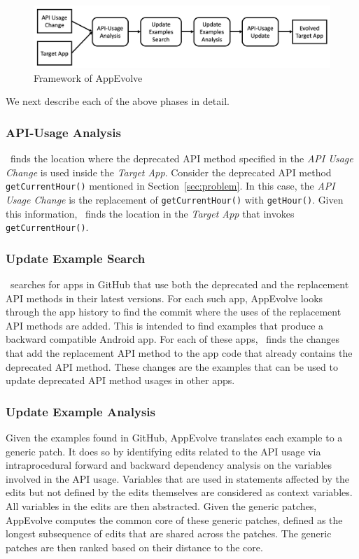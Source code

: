 \begin{figure}[t]
	\centering
	\includegraphics[width=0.8\linewidth]{framework.png}
	\caption{Framework of AppEvolve}
	\label{fig:framework}
\end{figure}

We next describe each of the above phases in detail.
\subsubsection{API-Usage Analysis}
\toolname\ finds the location where the deprecated API method specified in
the {\em API Usage Change} is used inside the {\em Target App}. Consider
the deprecated API method \texttt{getCurrentHour()} mentioned in
Section~\ref{sec:problem}.  In this case, the {\em API Usage Change} is the
replacement of \texttt{getCurrentHour()} with \texttt{getHour()}. Given
this information, \toolname\ finds the location in the {\em Target App}
that invokes \texttt{getCurrentHour()}.

\subsubsection{Update Example Search}
\toolname\ searches for apps in GitHub that use both the deprecated and the
replacement API methods in their latest versions.  For each such app,
AppEvolve looks through the app history to find the commit where the uses
of the replacement API methods are added. This is intended to find examples
that produce a backward compatible Android app.  For each of these apps,
\toolname\ finds the changes that add the replacement API method to the app
code that already contains the deprecated API method. These changes are the
examples that can be used to update deprecated API method usages in other
apps.

\subsubsection{Update Example Analysis}
Given the examples found in GitHub, AppEvolve translates each example to a
generic patch. It does so by identifying edits related to the API usage via
intraprocedural forward and backward dependency analysis on the variables
involved in the API usage. Variables that are used in statements affected
by the edits but not defined by the edits themselves are considered as
context variables. All variables in the edits are then abstracted. Given
the generic patches, AppEvolve computes the common core of these generic
patches, defined as the longest subsequence of edits that are shared across
the patches. The generic patches are then ranked based on their distance to
the core.

